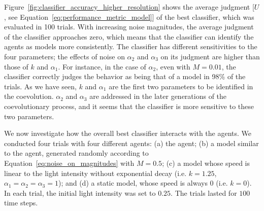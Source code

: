 Figure~\ref{fig:classifier_accuracy_higher_resolution} shows the average judgment [$U$, see Equation~\ref{eq:performance_metric_model}] of the best classifier, which was evaluated in 100 trials. With increasing noise magnitudes, the average judgment of the classifier approaches zero, which means that the classifier can identify the agents as models more consistently. The classifier has different sensitivities to the four parameters; the effects of noise on $\alpha_2$ and $\alpha_3$ on its judgment are higher than those of $k$ and $\alpha_1$. For instance, in the case of $\alpha_2$, even with $M=0.01$, the classifier correctly judges the behavior as being that of a model in 98\% of the trials. As we have seen, $k$ and $\alpha_1$ are the first two parameters to be identified in the coevolution. $\alpha_2$ and $\alpha_3$ are addressed in the later generations of the coevolutionary process, and it seems that the classifier is more sensitive to these two parameters.

We now investigate how the overall best classifier interacts with the agents. We conducted four trials with four different agents: (a) the agent; (b) a model similar to the agent, generated randomly according to Equation~\ref{eq:noise_on_magnitudes} with $M=0.5$; (c) a model whose speed is linear to the light intensity without exponential decay (i.e. $k=1.25$, $\alpha_1 = \alpha_2 = \alpha_3 = 1$); and (d) a static model, whose speed is always $0$ (i.e. $k=0$). In each trial, the initial light intensity was set to $0.25$. The trials lasted for $100$ time steps. 

